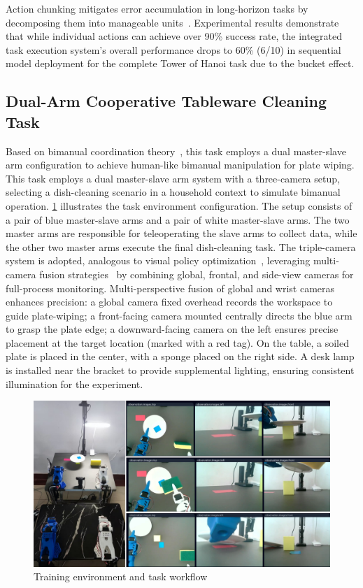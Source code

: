 \documentclass[runningheads]{llncs}
\begin{document}
Action chunking mitigates error accumulation in long-horizon tasks by decomposing them into manageable units~\cite{ref10}. Experimental results demonstrate that while individual actions can achieve over 90\% success rate, the integrated task execution system's overall performance drops to 60\% (6/10) in sequential model deployment for the complete Tower of Hanoi task due to the bucket effect.

\subsection{Dual-Arm Cooperative Tableware Cleaning Task}
Based on bimanual coordination theory~\cite{ref11}, this task employs a dual master-slave arm configuration to achieve human-like bimanual manipulation for plate wiping. This task employs a dual master-slave arm system with a three-camera setup, selecting a dish-cleaning scenario in a household context to simulate bimanual operation. \cref{fig9} illustrates the task environment configuration. The setup consists of a pair of blue master-slave arms and a pair of white master-slave arms. The two master arms are responsible for teleoperating the slave arms to collect data, while the other two master arms execute the final dish-cleaning task. The triple-camera system is adopted, analogous to visual policy optimization~\cite{ref12}, leveraging multi-camera fusion strategies~\cite{ref13} by combining global, frontal, and side-view cameras for full-process monitoring. Multi-perspective fusion of global and wrist cameras enhances precision: a global camera fixed overhead records the workspace to guide plate-wiping; a front-facing camera mounted centrally directs the blue arm to grasp the plate edge; a downward-facing camera on the left ensures precise placement at the target location (marked with a red tag). On the table, a soiled plate is placed in the center, with a sponge placed on the right side. A desk lamp is installed near the bracket to provide supplemental lighting, ensuring consistent illumination for the experiment.

\begin{figure}
\centering
\includegraphics[width=\textwidth]{fig9.pdf}
\caption{ Training environment and task workflow} \label{fig9}
\end{figure}
\end{document}

